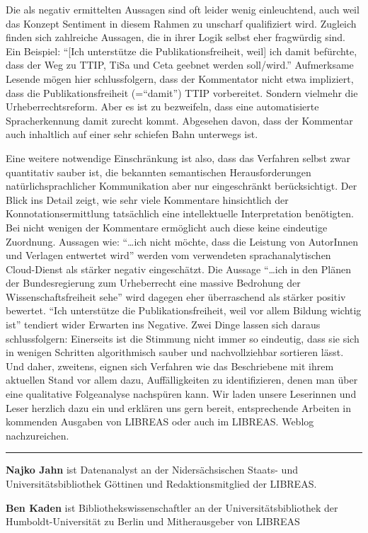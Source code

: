 \documentclass[a4paper,
fontsize=11pt,
oneside,
numbers=noperiodatend,
parskip=half-,
bibliography=totoc,
final
]{scrartcl}
\begin{document}
Die als negativ ermittelten Aussagen sind oft leider wenig einleuchtend,
auch weil das Konzept Sentiment in diesem Rahmen zu unscharf
qualifiziert wird. Zugleich finden sich zahlreiche Aussagen, die in
ihrer Logik selbst eher fragwürdig sind. Ein Beispiel: \enquote{{[}Ich
unterstütze die Publikationsfreiheit, weil{]} ich damit befürchte, dass
der Weg zu TTIP, TiSa und Ceta geebnet werden soll/wird.} Aufmerksame
Lesende mögen hier schlussfolgern, dass der Kommentator nicht etwa
impliziert, dass die Publikationsfreiheit (=\enquote{damit}) TTIP
vorbereitet. Sondern vielmehr die Urheberrechtsreform. Aber es ist zu
bezweifeln, dass eine automatisierte Spracherkennung damit zurecht
kommt. Abgesehen davon, dass der Kommentar auch inhaltlich auf einer
sehr schiefen Bahn unterwegs ist.

Eine weitere notwendige Einschränkung ist also, dass das Verfahren
selbst zwar quantitativ sauber ist, die bekannten semantischen
Herausforderungen natürlichsprachlicher Kommunikation aber nur
eingeschränkt berücksichtigt. Der Blick ins Detail zeigt, wie sehr viele
Kommentare hinsichtlich der Konnotationsermittlung tatsächlich eine
intellektuelle Interpretation benötigten. Bei nicht wenigen der
Kommentare ermöglicht auch diese keine eindeutige Zuordnung. Aussagen
wie: \enquote{\ldots{}ich nicht möchte, dass die Leistung von AutorInnen
und Verlagen entwertet wird} werden vom verwendeten sprachanalytischen
Cloud-Dienst als stärker negativ eingeschätzt. Die Aussage
\enquote{\ldots{}ich in den Plänen der Bundesregierung zum Urheberrecht
eine massive Bedrohung der Wissenschaftsfreiheit sehe} wird dagegen eher
überraschend als stärker positiv bewertet. \enquote{Ich unterstütze die
Publikationsfreiheit, weil vor allem Bildung wichtig ist} tendiert wider
Erwarten ins Negative. Zwei Dinge lassen sich daraus schlussfolgern:
Einerseits ist die Stimmung nicht immer so eindeutig, dass sie sich in
wenigen Schritten algorithmisch sauber und nachvollziehbar sortieren
lässt. Und daher, zweitens, eignen sich Verfahren wie das Beschriebene
mit ihrem aktuellen Stand vor allem dazu, Auffälligkeiten zu
identifizieren, denen man über eine qualitative Folgeanalyse nachspüren
kann. Wir laden unsere Leserinnen und Leser herzlich dazu ein und
erklären uns gern bereit, entsprechende Arbeiten in kommenden Ausgaben
von LIBREAS oder auch im LIBREAS. Weblog nachzureichen.

\begin{center}\rule{0.5\linewidth}{\linethickness}\end{center}

\textbf{Najko Jahn} ist Datenanalyst an der Nidersächsischen Staats- und
Universitätsbibliothek Göttinen und Redaktionsmitglied der LIBREAS.

\textbf{Ben Kaden} ist Bibliothekswissenschaftler an der
Universitätsbibliothek der Humboldt-Universität zu Berlin und
Mitherausgeber von LIBREAS
\end{document}
